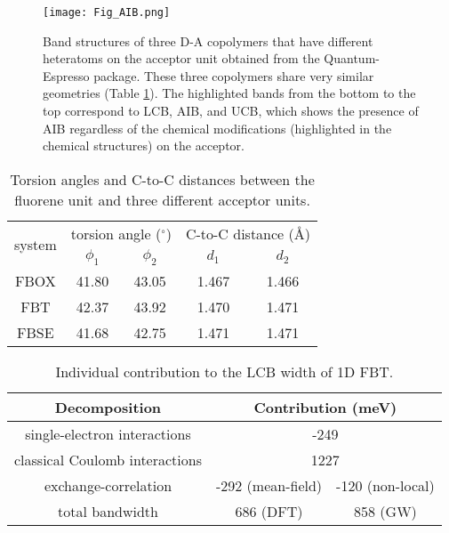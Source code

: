 \documentclass[journal = jpclcd]{achemso}
\begin{document}
\begin{figure}[H]
    \centering
    \texttt{[image: Fig\_AIB.png]}
    \caption{Band structures of three D-A copolymers that have different heteratoms on the acceptor unit obtained from the Quantum-Espresso package. These three copolymers share very similar geometries (Table \ref{tab:3polymer_geometry_info}). The highlighted bands from the bottom to the top correspond to LCB, AIB, and UCB, which shows the presence of AIB regardless of the chemical modifications (highlighted in the chemical structures) on the acceptor.\cite{Chua2019}} 
    \label{Fig_AIB}
\end{figure}

\begin{table}[H]
     \centering
     \begin{tabular}{c|c|c|c|c}
 \multirow{2}{*}{system} & \multicolumn{2}{c|}{torsion angle ($^\circ$)} & \multicolumn{2}{c}{C-to-C distance (\AA)} \\ \cline{2-5} 
                         & $\phi_1$         & $\phi_2$        & $d_1$             & $d_2$                                       \\ \hline
 FBOX                    & 41.80            & 43.05           & 1.467             & 1.466                                   \\
 FBT                     & 42.37            & 43.92           & 1.470             & 1.471                                      \\
 FBSE                    & 41.68            & 42.75           & 1.471             & 1.471                                    
     \end{tabular}
     \caption{Torsion angles and C-to-C distances between the fluorene unit and three different acceptor units.}
     \label{tab:3polymer_geometry_info}
\end{table}


\begin{table}[H]
\centering
\begin{tabular}{c|c|c}
Decomposition                  & \multicolumn{2}{c}{Contribution {(}meV{)}} \\ \hline
single-electron interactions   & \multicolumn{2}{c}{-249}                   \\ \hline
classical Coulomb interactions & \multicolumn{2}{c}{1227}                   \\ \hline
exchange-correlation           & -292 (mean-field)     & -120 (non-local)    \\ \hline
total bandwidth                & 686 (DFT)             & 858 (GW)           
\end{tabular}
\caption{Individual contribution to the LCB width of 1D FBT.}
\label{tab:energydecomposition}
\end{table}
\end{document}
